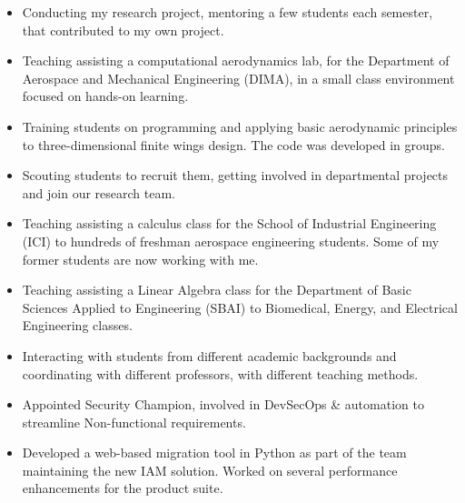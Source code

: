 	\divider

	\begin{itemize}
		\item Conducting my research project, mentoring a few students each semester, that contributed to my own project.
	\end{itemize}
	\smallskip

	\medskip

	\begin{itemize}
		\item Teaching assisting a computational aerodynamics lab, for the Department of Aerospace and Mechanical Engineering (DIMA), in a small class environment focused on hands-on learning.
		\item Training students on programming and applying basic aerodynamic principles to three-dimensional finite wings design. The code was developed in groups.
		\item Scouting students to recruit them, getting involved in departmental projects and join our research team.
	\end{itemize}
	\medskip

	\begin{itemize}
		\item Teaching assisting a calculus class for the School of Industrial Engineering (ICI) to hundreds of freshman aerospace engineering students. Some of my former students are now working with me.
		\item Teaching assisting a Linear Algebra class for the Department of Basic Sciences Applied to Engineering (SBAI) to Biomedical, Energy, and Electrical Engineering classes.
		\item Interacting with students from different academic backgrounds and coordinating with different professors, with different teaching methods.
	\end{itemize}
\else
	\begin{itemize}
		\item Appointed Security Champion, involved in DevSecOps \& automation to streamline Non-functional requirements.
		\item Developed a web-based migration tool in Python as part of the team maintaining the new IAM solution. Worked on several performance enhancements for the product suite.
	\end{itemize}
	\smallskip
	 \\

